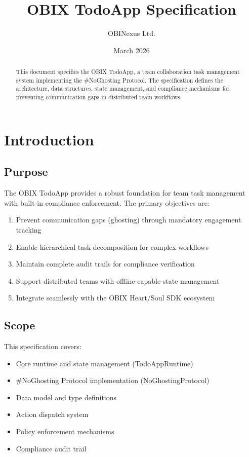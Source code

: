 \documentclass[12pt,a4paper]{article}
\title{OBIX TodoApp Specification}
\author{OBINexus Ltd.}
\date{March 2026}
\begin{document}
\maketitle

\begin{abstract}
This document specifies the OBIX TodoApp, a team collaboration task management system implementing the \#NoGhosting Protocol. The specification defines the architecture, data structures, state management, and compliance mechanisms for preventing communication gaps in distributed team workflows.
\end{abstract}

\tableofcontents
\newpage

\section{Introduction}

\subsection{Purpose}
The OBIX TodoApp provides a robust foundation for team task management with built-in compliance enforcement. The primary objectives are:

\begin{enumerate}
  \item Prevent communication gaps (ghosting) through mandatory engagement tracking
  \item Enable hierarchical task decomposition for complex workflows
  \item Maintain complete audit trails for compliance verification
  \item Support distributed teams with offline-capable state management
  \item Integrate seamlessly with the OBIX Heart/Soul SDK ecosystem
\end{enumerate}

\subsection{Scope}
This specification covers:
\begin{itemize}
  \item Core runtime and state management (TodoAppRuntime)
  \item \#NoGhosting Protocol implementation (NoGhostingProtocol)
  \item Data model and type definitions
  \item Action dispatch system
  \item Policy enforcement mechanisms
  \item Compliance audit trail
\end{itemize}
\end{document}
